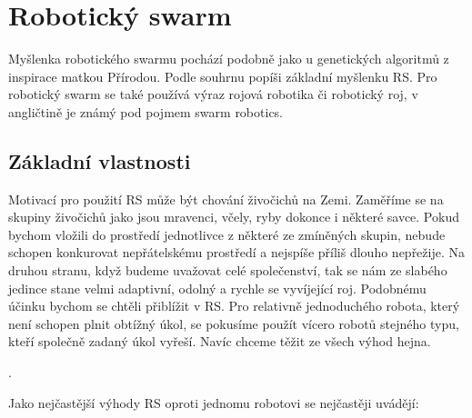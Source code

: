 
\chapter{Robotický swarm}
Myšlenka robotického swarmu pochází podobně jako u genetických algoritmů z inspirace matkou Přírodou. Podle souhrnu \citep{swarmRobotic} popíši základní myšlenku RS. Pro robotický swarm se také používá výraz rojová robotika či robotický roj, v angličtině je známý pod pojmem swarm robotics. 
\section*{Základní vlastnosti}
Motivací pro použití RS může být chování živočichů na Zemi. Zaměříme se na skupiny živočichů jako jsou mravenci, včely, ryby dokonce i některé savce. Pokud bychom vložili do prostředí jednotlivce z některé ze zmíněných skupin, nebude schopen konkurovat nepřátelskému prostředí a nejspíše příliš dlouho nepřežije. Na druhou stranu, když budeme uvažovat celé společenství, tak se nám ze slabého jedince stane velmi adaptivní, odolný a rychle se vyvíjející roj. Podobnému účinku bychom se chtěli přiblížit v RS. Pro relativně jednoduchého robota, který není schopen plnit obtížný úkol, se pokusíme použít vícero robotů stejného typu, kteří společně zadaný úkol vyřeší. Navíc chceme těžit ze všech výhod hejna. \par. 
\par
Jako nejčastější výhody RS oproti jednomu robotovi se nejčastěji uvádějí:
